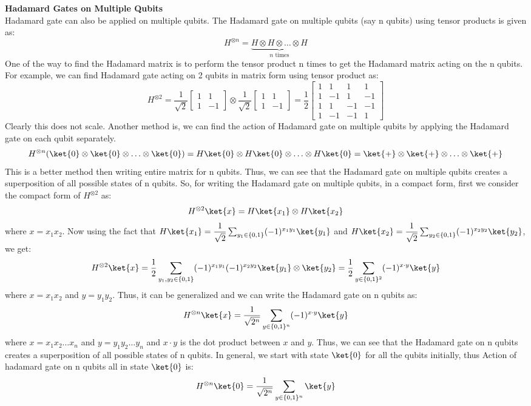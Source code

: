 \documentclass[12pt, oneside]{book}
\theoremstyle{definition}
\theoremstyle{definition}
\theoremstyle{remark}
\begin{document}
\textbf{Hadamard Gates on Multiple Qubits}\\
Hadamard gate can also be applied on multiple qubits. The Hadamard gate on multiple qubits (say n qubits) using tensor products is given as:
\[
    H^{\otimes n}=\underbrace{H\otimes H\otimes \ldots \otimes H}_{n \text{ times}}
\]
One of the way to find the Hadamard matrix is to perform the tensor product n times to get the Hadamard matrix acting on the n qubits. For example, we can find Hadamard gate acting on 2 qubits in matrix form using tensor product as:
\[
    H^{\otimes 2}=\dfrac{1}{\sqrt{2}}\begin{bmatrix}
        1 & 1 \\
        1 & -1
    \end{bmatrix}\otimes \dfrac{1}{\sqrt{2}}\begin{bmatrix}
        1 & 1 \\
        1 & -1
    \end{bmatrix}=\dfrac{1}{2}\begin{bmatrix}
        1 & 1 & 1 & 1 \\
        1 & -1 & 1 & -1 \\
        1 & 1 & -1 & -1 \\
        1 & -1 & -1 & 1
    \end{bmatrix}
\]
Clearly this does not scale.
Another method is, we can find the action of Hadamard gate on multiple qubits by applying the Hadamard gate on each qubit separately.
\[
    H^{\otimes n}(\ket{0}\otimes \ket{0}\otimes \ldots \otimes \ket{0})=H\ket{0}\otimes H\ket{0}\otimes \ldots \otimes H\ket{0}=\ket{+}\otimes \ket{+}\otimes \ldots \otimes \ket{+}
\]
This is a better method then writing entire matrix for n qubits. Thus, we can see that the Hadamard gate on multiple qubits creates a superposition of all possible states of n qubits.
So, for writing the Hadamard gate on multiple qubits, in a compact form, first we consider the compact form of $H^{\otimes 2}$ as:
\[
H^{\otimes 2}\ket{x}=H\ket{x_1}\otimes H\ket{x_2}
\] 
where $x=x_1x_2$. Now using the fact that $H\ket{x_1}=\dfrac{1}{\sqrt{2}}\sum_{y_1 \in \{0,1\}} (-1)^{x_1y_1}\ket{y_1}$ and $H\ket{x_2}=\dfrac{1}{\sqrt{2}}\sum_{y_2 \in \{0,1\}} (-1)^{x_2y_2}\ket{y_2}$, we get:
\[ 
H^{\otimes 2}\ket{x}=\dfrac{1}{2}\sum_{y_1,y_2 \in \{0,1\}} (-1)^{x_1y_1}(-1)^{x_2y_2}\ket{y_1}\otimes \ket{y_2}=\dfrac{1}{2}\sum_{y \in \{0,1\}^2}(-1)^{x\cdot y}\ket{y}
\]
where $x=x_1x_2$ and $y=y_1y_2$. Thus, it can be generalized and we can write the Hadamard gate on n qubits as:
\[
H^{\otimes n}\ket{x}=\dfrac{1}{\sqrt{2^n}}\sum_{y \in \{0,1\}^n}(-1)^{x\cdot y}\ket{y}
\]
where $x=x_1x_2\ldots x_n$ and $y=y_1y_2\ldots y_n$ and $x\cdot y$ is the dot product between $x$ and $y$. Thus, we can see that the Hadamard gate on n qubits creates a superposition of all possible states of n qubits.
In general, we start with state $\ket{0}$ for all the qubits initially, thus Action of hadamard gate on n qubits all in state $\ket{0}$ is:
\[
    H^{\otimes n}\ket{0}=\dfrac{1}{\sqrt{2^n}}\sum_{y \in \{0,1\}^n}\ket{y}
\]
\end{document}
